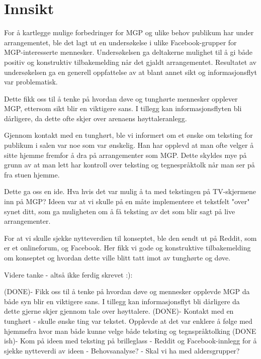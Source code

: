 \section{Innsikt}
\label{sec:innsikt}
For å kartlegge mulige forbedringer for MGP og ulike behov publikum har under arrangementet, ble det lagt ut en undersøkelse i ulike Facebook-grupper for MGP-interesserte mennesker. Undersøkelsen ga deltakerne mulighet til å gi både positiv og konstruktiv tilbakemelding når det gjaldt arrangementet. Resultatet av undersøkelsen ga en generell oppfattelse av at blant annet sikt og informasjonsflyt var problematisk. 

Dette fikk oss til å tenke på hvordan døve og tunghørte mennesker opplever MGP, ettersom sikt blir en viktigere sans. I tillegg kan informasjonsflyten bli dårligere, da dette ofte skjer over arenaens høyttaleranlegg. 

Gjennom kontakt med en tunghørt, ble vi informert om et ønske om teksting for publikum i salen var noe som var ønskelig. Han har opplevd at man ofte velger å sitte hjemme fremfor å dra på arrangementer som MGP. Dette skyldes mye på grunn av at man lett har kontroll over teksting og tegnespråktolk når man ser på fra stuen hjemme. 

Dette ga oss en ide. Hva hvis det var mulig å ta med tekstingen på TV-skjermene inn på MGP? Ideen var at vi skulle på en måte implementere et tekstfelt "over" synet ditt, som ga muligheten om å få teksting av det som blir sagt på live arrangementer. 

For at vi skulle sjekke nytteverdien til konseptet, ble den sendt ut på Reddit, som er et onlineforum, og Facebook. Her fikk vi gode og konstruktive tilbakemelding om konseptet og hvordan dette ville blitt tatt imot av tunghørte og døve. 



Videre tanke - altså ikke ferdig skrevet :):

(DONE)- Fikk oss til å tenke på hvordan døve og mennesker opplevde MGP da både syn blir en viktigere sans. I tillegg kan informasjonsflyt bli dårligere da dette gjerne skjer gjennom tale over høyttalere. \newline
(DONE)- Kontakt med en tunghørt - skulle ønske ting var tekstet. Opplevde at det var enklere å følge med hjemmefra hvor man både kunne velge både teksting og tegnspråktolking
(DONE ish)- Kom på ideen med teksting på brilleglass\newline
- Reddit og Facebook-innlegg for å sjekke nytteverdi av ideen \newline
- Behovsanalyse?\newline
- Skal vi ha med aldersgrupper?



